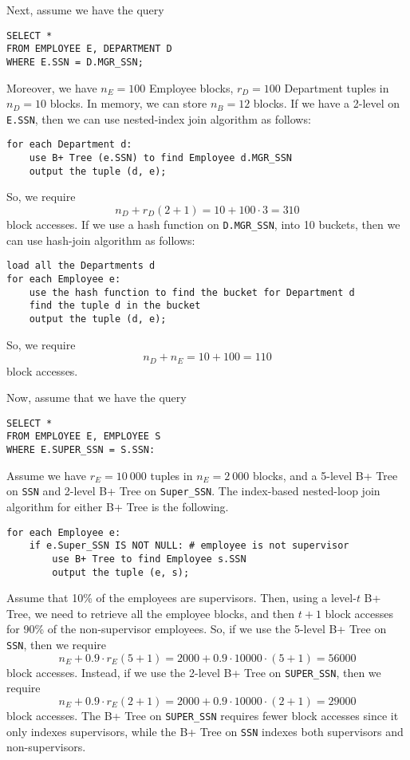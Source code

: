 \documentclass[a4paper, openany]{memoir}
\theoremstyle{definition}
\theoremstyle{plain}
\begin{document}
Next, assume we have the query
\begin{verbatim}
SELECT *
FROM EMPLOYEE E, DEPARTMENT D
WHERE E.SSN = D.MGR_SSN;
\end{verbatim}
Moreover, we have $n_E = 100$ Employee blocks, $r_D = 100$ Department tuples in $n_D = 10$ blocks. In memory, we can store $n_B = 12$ blocks. If we have a 2-level on \texttt{E.SSN}, then we can use nested-index join algorithm as follows:
\begin{verbatim}
for each Department d:
    use B+ Tree (e.SSN) to find Employee d.MGR_SSN
    output the tuple (d, e);
\end{verbatim}
So, we require
\[n_D + r_D (2 + 1) = 10 + 100 \cdot 3 = 310\]
block accesses. If we use a hash function on \texttt{D.MGR\_SSN}, into 10 buckets, then we can use hash-join algorithm as follows:
\begin{verbatim}
load all the Departments d
for each Employee e:
    use the hash function to find the bucket for Department d
    find the tuple d in the bucket
    output the tuple (d, e);
\end{verbatim}
So, we require
\[n_D + n_E = 10 + 100 = 110\]
block accesses.

Now, assume that we have the query
\begin{verbatim}
SELECT *
FROM EMPLOYEE E, EMPLOYEE S
WHERE E.SUPER_SSN = S.SSN:
\end{verbatim}
Assume we have $r_E = 10 \ 000$ tuples in $n_E = 2 \ 000$ blocks, and a 5-level B+ Tree on \texttt{SSN} and 2-level B+ Tree on \texttt{Super\_SSN}. The index-based nested-loop join algorithm for either B+ Tree is the following.
\begin{verbatim}
for each Employee e:
    if e.Super_SSN IS NOT NULL: # employee is not supervisor
        use B+ Tree to find Employee s.SSN
        output the tuple (e, s);
\end{verbatim}
Assume that 10\% of the employees are supervisors. Then, using a level-$t$ B+ Tree, we need to retrieve all the employee blocks, and then $t+1$ block accesses for 90\% of the non-supervisor employees. So, if we use the 5-level B+ Tree on \texttt{SSN}, then we require
\[n_E + 0.9 \cdot r_E (5 + 1) = 2000 + 0.9 \cdot 10000 \cdot (5 + 1) = 56 000\]
block accesses. Instead, if we use the 2-level B+ Tree on \texttt{SUPER\_SSN}, then we require
\[n_E + 0.9 \cdot r_E (2 + 1) = 2000 + 0.9 \cdot 10000 \cdot (2 + 1) = 29 000\]
block accesses. The B+ Tree on \texttt{SUPER\_SSN} requires fewer block accesses since it only indexes supervisors, while the B+ Tree on \texttt{SSN} indexes both supervisors and non-supervisors.
\end{document}
